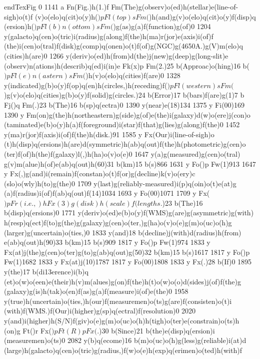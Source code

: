 {{{{{{{{{{{{{{{{{{ endTexFig
 0 1141 a Fn(Fig.)h(1.{)f Fm(The)g(observ)o(ed)h(stellar)e(line-of-sigh)o(t)f
(v)o(elo)q(cit)o(y)h(\()p Fl(top)s Fm(\))h(and)g(v)o(elo)q(cit)o(y)f(disp)q
(ersion)h(\()p Fl(b)n(ottom)s Fm(\))g(as)g(a)f(function)g(of)0
1204 y(galacto)q(cen)o(tric)i(radius)g(along)f(the)h(ma)r(jor)e(axis)i(of)f
(the)i(cen)o(tral)f(disk)g(comp)q(onen)o(t)f(of)g(NGC)g(4650A.)g(V)m(elo)q
(cities)h(are)0 1266 y(deriv)o(ed)h(from)d(the)j(new)g(deep)g(long-slit)e
(observ)n(ations)h(describ)q(ed)i(in)e Fk(x)p Fm(2.)25 b(Approac)o(hing)16
b(\()p Fl(e)n(astern)s Fm(\))h(v)o(elo)q(cities)f(are)0 1328
y(indicated)g(b)o(y)f(op)q(en)h(circles,)h(receding)f(\()p
Fl(western)s Fm(\))g(v)o(elo)q(cities)g(b)o(y)f(solid)g(circles.)24
b(Error)17 b(bars)f(are)g(1)7 b Fj()q Fm(.)23 b(The)16
b(sp)q(ectra)0 1390 y(near)e(18)134 1375 y Fi(00)169 1390 y
Fm(on)g(the)h(northeastern)g(side)g(of)e(the)i(galaxy)d(w)o(ere)j(con)o
(taminated)e(b)o(y)h(a)f(foreground)i(star)f(that)g(lies)g(along)f(the)0
1452 y(ma)r(jor)f(axis)i(of)f(the)h(disk.)91 1585 y Fx(Our)i(line-of-sigh)o
(t)h(disp)q(ersions)h(are)d(symmetric)h(ab)q(out)f(the)h(photometric)g(cen)o
(ter)f(of)h(the)f(galaxy)l(,)h(ha)o(v)o(e)0 1647 y(a)g(measured)g(cen)o(tral)
g(v)m(alue)h(of)e(ab)q(out)h(60)31 b(km)15 b(s)866 1631 y Fo()p
Fw(1)913 1647 y Fx(,)g(and)i(remain)f(constan)o(t)f(or)g(decline)k(v)o(ery)c
(slo)o(wly)h(to)g(the)0 1709 y(last)g(reliably-measured)i(p)q(oin)o(t)e(at)g
(a)f(radius)i(of)f(ab)q(out)f(14)1034 1693 y Fo(00)1071 1709
y Fx(\()p Fr(i.e.,)h Fx(3)g(disk)h(scale)f(lengths\).)23 b(The)16
b(disp)q(ersions)0 1771 y(deriv)o(ed)e(b)o(y)f(WMS)g(are)g(asymmetric)g(with)
h(resp)q(ect)f(to)g(the)g(galaxy)g(cen)o(ter,)g(ha)o(v)o(e)g(m)o(uc)o(h)g
(larger)g(uncertain)o(ties,)0 1833 y(and)18 b(decline)j(with)d(radius)h(from)
e(ab)q(out)h(90)33 b(km)15 b(s)909 1817 y Fo()p Fw(1)974
1833 y Fx(at)j(the)g(cen)o(ter)g(to)g(ab)q(out)g(50)32 b(km)15
b(s)1617 1817 y Fo()p Fw(1)1682 1833 y Fx(at)j(10)1787
1817 y Fo(00)1808 1833 y Fx(.)28 b(If)0 1895 y(the)17 b(di\013erence)i(b)q
(et)o(w)o(een)e(their)h(v)m(alues)g(on)f(the)h(t)o(w)o(o)d(sides)j(of)f(the)g
(galaxy)g(is)h(tak)o(en)f(as)g(a)f(measure)i(of)e(the)0 1958
y(true)h(uncertain)o(ties,)h(our)f(measuremen)o(ts)g(are)f(consisten)o(t)i
(with)f(WMS.)f(Our)i(higher)g(sp)q(ectral)f(resolution)0 2020
y(and)i(higher)h(S/N)f(giv)o(e)g(m)o(uc)o(h)h(tigh)o(ter)e(constrain)o(ts)h
(on)g Ft()r Fx(\()p Ft(R)p Fx(\).)30 b(Since)21 b(the)e(disp)q(ersion)i
(measuremen)o(ts)0 2082 y(b)q(ecome)16 b(m)o(uc)o(h)g(less)g(reliable)i(at)d
(large)h(galacto)q(cen)o(tric)g(radius,)f(w)o(e)h(exp)q(erimen)o(ted)h(with)f
}}}}}}}}}}}}}}}}}}}
